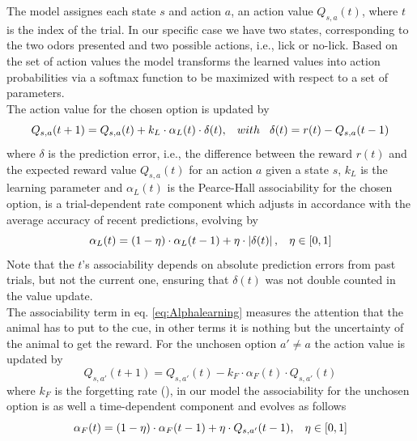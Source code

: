 The model assignes each state $s$ and action $a$, an action value $Q_{s,a}(t)$, where $t$ is the index of the trial. In our specific case we have two states, corresponding to the two odors presented and two possible actions, i.e., lick or no-lick. 
Based on the set of action values the model transforms the learned values into action probabilities via a softmax function to be maximized with respect to a set of parameters.\\The action value for the chosen option is updated by
\begin{equation}
Q_{s,a}(t+1)  = Q_{s,a}(t)+k_L\cdot\alpha_L(t)\cdot\delta(t), \hspace{0.3cm} with \hspace{0.3cm}\delta(t)=r(t)-Q_{s,a}(t-1)
\label{eq:Qlearning}
\end{equation}
where $\delta$ is the prediction error, i.e., the difference between the reward $r(t)$ and the expected reward value $Q_{s,a}(t)$ for an action $a$ given a state $s$, $k_L$ is the learning parameter and $\alpha_L(t)$ is the Pearce-Hall associability for the chosen option, is a trial-dependent rate component which adjusts in accordance with the average accuracy of recent predictions, evolving by
\begin{equation}
   \alpha_L(t)=(1-\eta)\cdot\alpha_L(t-1)+\eta\cdot\left\lvert\delta(t)\right\rvert,\hspace{0.3cm} \eta\in[0,1]
    \label{eq:Alphalearning}
\end{equation}
Note that the $t$'s associability depends on absolute prediction errors from past trials, but not the current one, ensuring that $\delta(t)$ was not double counted in the value update.\\The associability term in eq. \ref{eq:Alphalearning} measures the attention that the animal has to put to the cue, in other terms it is nothing but the uncertainty of the animal to get the reward. 
For the unchosen option $a'\neq a$ the action value is updated by
\begin{equation}
    Q_{s,a'}(t+1) = Q_{s,a'}(t)-k_F\cdot\alpha_F(t)\cdot Q_{s,a'}(t)
    \label{eq:Qforgetting}
\end{equation}
where $k_F$ is the forgetting rate (\cite{ItoDoya1}), in our model the associability for the unchosen option is as well a time-dependent component and evolves as follows
\begin{equation}
    \alpha_F(t)=(1-\eta)\cdot\alpha_F(t-1)+\eta\cdot Q_{s,a'}(t-1), \hspace{0.3cm}
    \eta\in[0,1]
    \label{eq:Alphaforgetting}
\end{equation}
